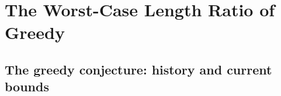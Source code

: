 \documentclass[11pt,a4paper]{article}   %
\makeatletter
\renewenvironment{proof}[1][\proofname]{\par
  \pushQED{\qed}%
  \normalfont \topsep1\p@\@plus1\p@\relax
  \trivlist
  \item[\hskip\labelsep\itshape #1\@addpunct{.}]\ignorespaces
}{\popQED\endtrivlist\@endpefalse}
\theoremstyle{compact}
\theoremstyle{compactdef}
\newcommand{\OPT}{\mathrm{OPT}}
\newcommand{\GR}{G}                         %
\newcommand{\ov}{\operatorname{ov}}         %
\newcommand{\str}[1]{\texttt{#1}}           %
\makeatother
\begin{document}

\section{The Worst-Case Length Ratio of Greedy}\label{sec:worstcase}

\subsection{The greedy conjecture: history and current bounds}
\label{sec:greedy-history}
\end{document}

